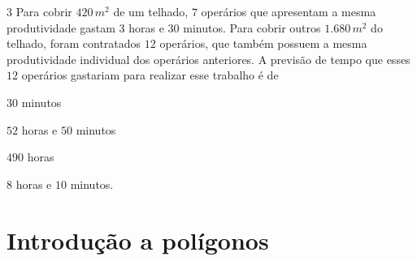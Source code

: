 {%


\num{3}  Para cobrir $420\,m^2$ de um telhado, $7$ operários que apresentam a mesma
produtividade gastam $3$ horas e $30$ minutos. Para cobrir outros $1.680\,m^2$
do telhado, foram contratados $12$ operários, que também possuem a mesma
produtividade individual dos operários anteriores. A previsão de tempo
que esses $12$ operários gastariam para realizar esse trabalho é de

\begin{escolha}
\item $30$ minutos
\item $52$ horas e $50$ minutos
\item $490$ horas
\item $8$ horas e $10$ minutos.
\end{escolha}



\chapter{Introdução a polígonos}

}
